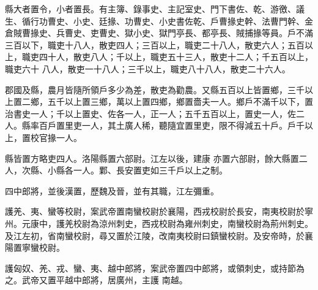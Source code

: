 \begin{pinyinscope}
 縣大者置令，小者置長。有主簿、錄事史、主記室史、門下書佐、乾、游徼、議生、循行功曹史、小史、廷掾、功曹史、小史書佐乾、戶曹掾史幹、法曹門幹、金倉賊曹掾史、兵曹史、吏曹史、獄小史、獄門亭長、都亭長、賊捕掾等員。戶不滿三百以下，職吏十八人，散吏四人；三百以上，職吏二十八人，散吏六人；五百以上，職吏四十人，散吏八人；千以上，職吏五十三人，散吏十二人；千五百以上，職吏六十
 八人，散吏一十八人；三千以上，職吏八十八人，散吏二十六人。



 郡國及縣，農月皆隨所領戶多少為差，散吏為勸農。又縣五百以上皆置鄉，三千以上置二鄉，五千以上置三鄉，萬以上置四鄉，鄉置嗇夫一人。鄉戶不滿千以下，置治書史一人；千以上置史、佐各一人，正一人；五千五百以上，置史一人，佐二人。縣率百戶置里吏一人，其土廣人稀，聽隨宜置里吏，限不得減五十戶。戶千以上，置校官掾一人。



 縣皆置方略吏四人。洛陽縣置六部尉。江左以後，建康
 亦置六部尉，餘大縣置二人，次縣、小縣各一人。鄴、長安置吏如三千戶以上之制。



 四中郎將，並後漢置，歷魏及晉，並有其職，江左彌重。



 護羌、夷、蠻等校尉，案武帝置南蠻校尉於襄陽，西戎校尉於長安，南夷校尉於寧州。元康中，護羌校尉為涼州刺史，西戎校尉為雍州刺史，南蠻校尉為荊州刺史。及江左初，省南蠻校尉，尋又置於江陵，改南夷校尉曰鎮蠻校尉。及安帝時，於襄陽置寧蠻校尉。



 護匈奴、羌、戎、蠻、夷、越中郎將，案武帝置四中郎將，或領刺史，或持節為之。武帝又置平越中郎將，居廣州，主護
 南越。



\end{pinyinscope}